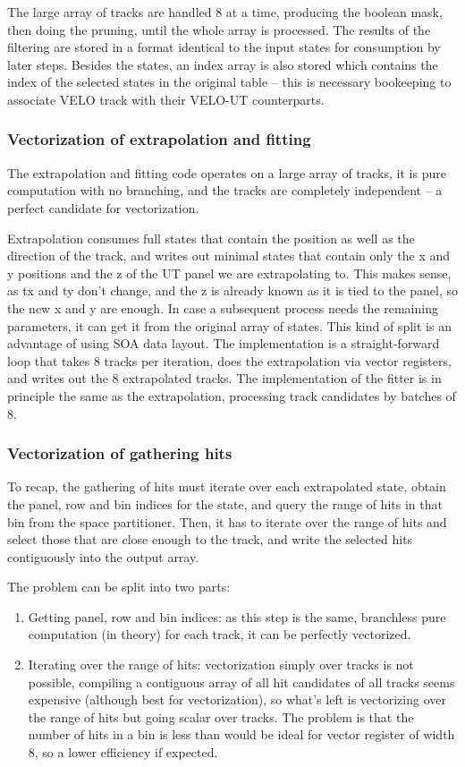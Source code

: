 \documentclass[12pt]{article}
\begin{document}
The large array of tracks are handled 8 at a time, producing the boolean mask, then doing the pruning, until the whole array is processed. The results of the filtering are stored in a format identical to the input states for consumption by later steps. Besides the states, an index array is also stored which contains the index of the selected states in the original table -- this is necessary bookeeping to associate VELO track with their VELO-UT counterparts.

\subsubsection{Vectorization of extrapolation and fitting}

The extrapolation and fitting code operates on a large array of tracks, it is pure computation with no branching, and the tracks are completely independent -- a perfect candidate for vectorization.

Extrapolation consumes full states that contain the position as well as the direction of the track, and writes out minimal states that contain only the x and y positions and the z of the UT panel we are extrapolating to. This makes sense, as tx and ty don't change, and the z is already known as it is tied to the panel, so the new x and y are enough. In case a subsequent process needs the remaining parameters, it can get it from the original array of states. This kind of split is an advantage of using SOA data layout. The implementation is a straight-forward loop that takes 8 tracks per iteration, does the extrapolation via vector registers, and writes out the 8 extrapolated tracks. The implementation of the fitter is in principle the same as the extrapolation, processing track candidates by batches of 8.


\subsubsection{Vectorization of gathering hits}

To recap, the gathering of hits must iterate over each extrapolated state, obtain the panel, row and bin indices for the state, and query the range of hits in that bin from the space partitioner. Then, it has to iterate over the range of hits and select those that are close enough to the track, and write the selected hits contiguously into the output array.

The problem can be split into two parts:
\begin{enumerate}
	\item Getting panel, row and bin indices: as this step is the same, branchless pure computation (in theory) for each track, it can be perfectly vectorized.
	\item Iterating over the range of hits: vectorization simply over tracks is not possible, compiling a contiguous array of all hit candidates of all tracks seems expensive (although best for vectorization), so what's left is vectorizing over the range of hits but going scalar over tracks. The problem is that the number of hits in a bin is less than would be ideal for vector register of width 8, so a lower efficiency if expected.
\end{enumerate}
\end{document}
